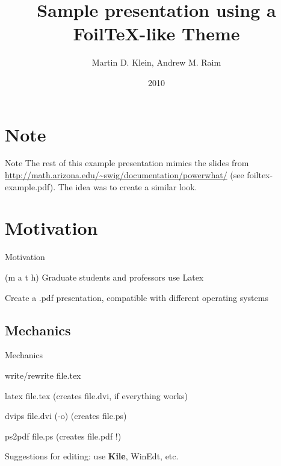 \documentclass[8pt,final,hyperref={pdfpagelabels=false},xcolor=dvipsnames]{beamer}
\begin{document}
\title[Example of FoilTex-like Theme]{Sample presentation using a FoilTeX-like Theme}
\author[M.Klein, A. Raim]{Martin D. Klein, Andrew M. Raim}
\date{2010}

\begin{frame}[plain]
\maketitle
\end{frame}


\section{Note}
\begin{frame}{Note}
The rest of this example presentation mimics the slides from
\url{http://math.arizona.edu/~swig/documentation/powerwhat/}
(see foiltex-example.pdf). The idea was to create a similar look.
\end{frame}


\section{Motivation}
\begin{frame}{Motivation}
\begin{Witemize}

\item (m a t h) Graduate students and professors use Latex

\item Create a .pdf presentation, compatible with different operating systems

\end{Witemize}
\end{frame}


\subsection{Mechanics}
\begin{frame}{Mechanics}
\begin{Witemize}[10pt]
\item write/rewrite file.tex\\
\item latex file.tex (creates file.dvi, if everything works)\\
\item dvips file.dvi (-o) (creates file.ps)\\
\item ps2pdf file.ps (creates file.pdf !)\\
\end{Witemize}

Suggestions for editing: use \textbf{Kile}, WinEdt, etc.
\end{frame}
\end{document}
